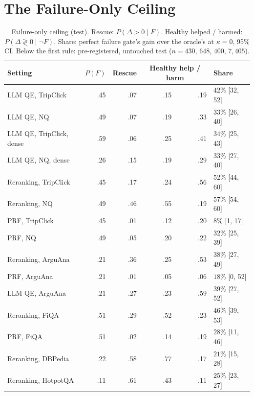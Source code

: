\documentclass[sigconf,anonymous,review]{acmart}
\begin{document}
\section{The Failure-Only Ceiling}
\label{sec:ceiling}

\begin{table}[t]
\caption{Failure-only ceiling (test). Rescue: $P(\Delta>0\mid F)$.
Healthy helped / harmed: $P(\Delta\gtrless0\mid\neg F)$. Share: perfect
failure gate's gain over the oracle's at $\kappa=0$, 95\% CI. Below the
first rule: pre-registered, untouched test ($n=430$, $648$, $400$, $7{,}405$).}
\label{tab:ceiling}
\footnotesize
\setlength{\tabcolsep}{3pt}
\begin{tabular}{@{}lrrrrl@{}}
\toprule
Setting & $P(F)$ & Rescue & \multicolumn{2}{c}{Healthy help / harm} & Share \\
\midrule
LLM QE, TripClick & .45 & .07 & .15 & .19 & $42\%$ [32, 52] \\
LLM QE, NQ        & .49 & .07 & .19 & .33 & $33\%$ [26, 40] \\
LLM QE, TripClick, dense & .59 & .06 & .25 & .41 & $34\%$ [25, 43] \\
LLM QE, NQ, dense & .26 & .15 & .19 & .29 & $33\%$ [27, 40] \\
Reranking, TripClick & .45 & .17 & .24 & .56 & $52\%$ [44, 60] \\
Reranking, NQ     & .49 & .46 & .55 & .19 & $57\%$ [54, 60] \\
PRF, TripClick    & .45 & .01 & .12 & .20 & $8\%$ [1, 17] \\
PRF, NQ           & .49 & .05 & .20 & .22 & $32\%$ [25, 39] \\
\midrule
Reranking, ArguAna & .21 & .36 & .25 & .53 & $38\%$ [27, 49] \\
PRF, ArguAna       & .21 & .01 & .05 & .06 & $18\%$ [0, 52] \\
LLM QE, ArguAna    & .21 & .27 & .23 & .59 & $39\%$ [27, 52] \\
Reranking, FiQA    & .51 & .29 & .52 & .23 & $46\%$ [39, 53] \\
PRF, FiQA          & .51 & .02 & .14 & .19 & $28\%$ [11, 46] \\
Reranking, DBPedia & .22 & .58 & .77 & .17 & $21\%$ [15, 28] \\
Reranking, HotpotQA & .11 & .61 & .43 & .11 & $25\%$ [23, 27] \\
\bottomrule
\end{tabular}
\end{table}
\end{document}
